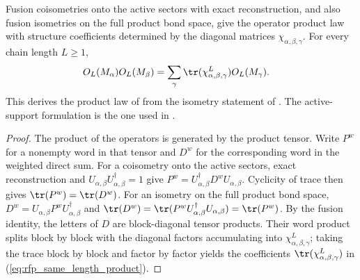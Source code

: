 \begin{lemma}%
    \label{thm:mpdo_fusion_same_length_product}
    \leanok
    Fusion coisometries onto the active sectors with exact reconstruction,
    and also fusion isometries on the full product bond space, give the
    operator product law with structure coefficients determined by the
    diagonal matrices $\chi_{\alpha,\beta,\gamma}$. For every chain
    length $L\ge 1$,
    \begin{align}
        O_L(M_\alpha)O_L(M_\beta)
         & =\sum_{\gamma}
        \tr(\chi_{\alpha,\beta,\gamma}^{L})O_L(M_\gamma).
        \label{eq:rfp_same_length_product}
    \end{align}
    This derives the product law of
    \cite[Theorem~4.14(ii)]{Cirac2016MPDO_arXiv} from the isometry statement
    of \cite[Theorem~4.14(iii)]{Cirac2016MPDO_arXiv}. The active-support
    formulation is the one used in
    \cite[Appendix~C.4, lines~2020--2029]{Cirac2016MPDO_arXiv}.
\end{lemma}
\begin{proof}\leanok
    The product of the operators is generated by the product tensor. Write
    $P^w$ for a nonempty word in that tensor and $D^w$ for the corresponding
    word in the weighted direct sum. For a coisometry onto the active
    sectors, exact reconstruction and
    $U_{\alpha,\beta}U_{\alpha,\beta}^\dagger=1$ give
    $P^w=U_{\alpha,\beta}^\dagger D^w U_{\alpha,\beta}$.
    Cyclicity of trace then gives $\tr(P^w)=\tr(D^w)$.
    For an isometry on the full product bond space,
    $D^w=U_{\alpha,\beta}P^wU_{\alpha,\beta}^\dagger$ and
    $\tr(D^w)=\tr(P^wU_{\alpha,\beta}^\dagger U_{\alpha,\beta})
        =\tr(P^w)$.
    By the fusion identity, the letters of $D$ are block-diagonal
    tensor products. Their word product splits block by block with the
    diagonal factors accumulating into $\chi_{\alpha,\beta,\gamma}^{L}$;
    taking the trace block by block and factor by factor yields the
    coefficients $\tr(\chi_{\alpha,\beta,\gamma}^{L})$ in
    (\ref{eq:rfp_same_length_product}).
\end{proof}

